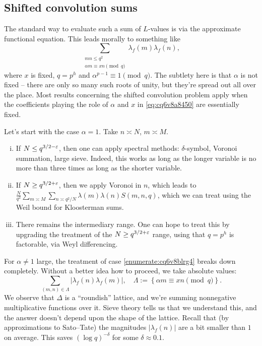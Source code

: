 \documentclass[reqno]{amsart} 
\begin{document}
\subsection{Shifted convolution sums}

The standard way to evaluate such a sum of $L$-values is via the approximate functional equation.  This leads morally to something like
\begin{equation}\label{eq:cq6v8a8450}
  \sum_{ \substack{
      m n \leq q^2  \\
      \alpha m \equiv x n \pmod{q}
    } } \lambda_f(m) \lambda_f(n),
\end{equation}
where $x$ is fixed, $q = p^{h}$ and $\alpha^{p - 1} \equiv 1 \pmod{q}$.  The subtlety here is that $\alpha$ is not fixed -- there are only so many such roots of unity, but they're spread out all over the place.  Most results concerning the shifted convolution problem apply when the coefficients playing the role of $\alpha$ and $x$ in \eqref{eq:cq6v8a8450} are essentially fixed.

Let's start with the case $\alpha = 1$.  Take $n \asymp N$, $m \asymp M$.
\begin{enumerate}[(i)]
\item\label{enumerate:cq6v8blrg4} If $N \leq q^{3/2 - \varepsilon}$, then one can apply spectral methods: $\delta$-symbol, Voronoi summation, large sieve.  Indeed, this works as long as the longer variable is no more than three times as long as the shorter variable.
\item\label{enumerate:cq6v8blt69} If $N \geq q^{3/2 + \varepsilon}$, then we apply Voronoi in $n$, which leads to $\frac{N}{q^2} \sum_{m \asymp M} \sum_{n \asymp q^2 / N} \lambda(m) \lambda(n) S(m, n, q)$, which we can treat using the Weil bound for Kloosterman sums.
\item\label{enumerate:cq6v8blu1b} There remains the intermediary range.  One can hope to treat this by upgrading the treatment of the $N \geq q^{3/2 + \varepsilon}$ range, using that $q = p^{h}$ is factorable, via Weyl differencing.
\end{enumerate}
For $\alpha \neq 1$ large, the treatment of case \eqref{enumerate:cq6v8blrg4} breaks down completely.  Without a better idea how to proceed, we take absolute values:
\begin{equation*}
  \sum_{(m, n) \in \Lambda}\lvert \lambda_f(n) \lambda_f(m) \rvert,
  \quad
  \Lambda := \left\{ \alpha m \equiv x n \pmod{q} \right\}.
\end{equation*}
We observe that $\Delta$ is a ``roundish'' lattice, and we're summing nonnegative multiplicative functions over it.  Sieve theory tells us that we understand this, and the answer doesn't depend upon the shape of the lattice.  Recall that (by approximations to Sato--Tate) the magnitudes $\lvert \lambda_f(n) \rvert$ are a bit smaller than $1$ on average.  This saves $(\log q)^{- \delta}$ for some $\delta \approx 0.1$.
\end{document}
